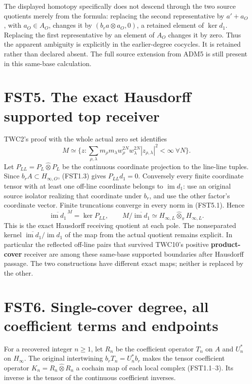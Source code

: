 The displayed homotopy specifically does not descend through the two
source quotients merely from the formula: replacing the second
representative by \(a'+a_O\), with \(a_O\in A_O\), changes it by
\((b_ra\otimes a_O,0)\), a retained element of \(\ker d_1\). Replacing
the first representative by an element of \(A_O\) changes it by zero.
Thus the apparent ambiguity is explicitly in the earlier-degree
cocycles. It is retained rather than declared absent. The full source
extension from ADM5 is still present in this same-base calculation.

\section{FST5. The exact Hausdorff supported top
receiver}\label{fst5.-the-exact-hausdorff-supported-top-receiver}

TWC2's proof with the whole actual zero set identifies \[
M\simeq\{z:\sum_{\rho,\lambda}m_\rho m_\lambda
 w_\rho^{2N}w_\lambda^{2N}|z_{\rho,\lambda}|^2<\infty\ \forall N\}.
\tag{FST5.1}
\] Let \(P_{LL}=P_L\widehat\otimes P_L\) be the continuous coordinate
projection to the line-line tuples. Since \(b_rA\subset H_{\infty,O}\),
(FST1.3) gives \(P_{LL}d_1=0\). Conversely every finite coordinate
tensor with at least one off-line coordinate belongs to
\(\operatorname{im}d_1\): use an original source isolator realizing that
coordinate under \(b_r\), and use the other factor's coordinate vector.
Finite truncations converge in every norm in (FST5.1). Hence \[
\boxed{\quad\overline{\operatorname{im}d_1}^{\,M}=\ker P_{LL},
\qquad M/\overline{\operatorname{im}d_1}\simeq
H_{\infty,L}\widehat\otimes_\pi H_{\infty,L}.\quad}
\tag{FST5.2}
\] This is the exact Hausdorff receiving quotient at each pole. The
nonseparated kernel
\(\overline{\operatorname{im}d_1}/\operatorname{im}d_1\) of the map from
the actual quotient remains explicit. In particular the reflected
off-line pairs that survived TWC10's positive \textbf{product-cover}
receiver are among these same-base supported boundaries after Hausdorff
passage. The two constructions have different exact maps; neither is
replaced by the other.

\section{FST6. Single-cover degree, all coefficient terms and
endpoints}\label{fst6.-single-cover-degree-all-coefficient-terms-and-endpoints}

For a recovered integer \(n\ge1\), let \(R_n\) be the coefficient
operator \(T_n\) on \(A\) and \(U_n^*\) on \(H_\infty\). The original
intertwining \(b_rT_n=U_n^*b_r\) makes the tensor coefficient operator
\(K_n=R_n\widehat\otimes R_n\) a cochain map of each local complex
(FST1.1--3). Its inverse is the tensor of the continuous coefficient
inverses.

